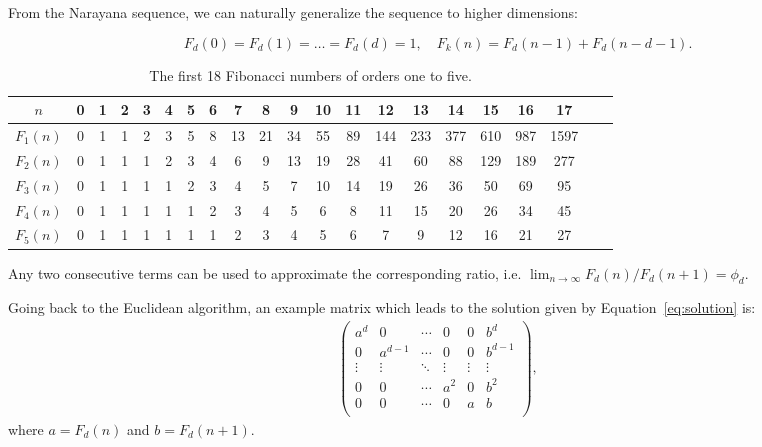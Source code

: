 \documentclass[english,version-2020-11]{uzl-thesis}
\begin{document}
From the Narayana sequence, we can naturally generalize the sequence to higher dimensions:

\[
  F_d(0) = F_d(1) = \dots = F_d(d) = 1, \quad F_k(n) = F_d(n - 1) + F_d(n - d - 1).
\]

\begin{table}[t]
  \caption{The first 18 Fibonacci numbers of orders one to five.}
  \begin{tabular}{c|cccccccccccccccccccc}
    $n$     & 0 & 1 & 2 & 3 & 4 & 5 & 6 & 7  & 8  & 9  & 10 & 11 & 12  & 13  & 14  & 15  & 16  & 17   \\ %
    \hline
    $F_1(n)$ & 0 & 1 & 1 & 2 & 3 & 5 & 8 & 13 & 21 & 34 & 55 & 89 & 144 & 233 & 377 & 610 & 987 & 1597 \\ %
    $F_2(n)$ & 0 & 1 & 1 & 1 & 2 & 3 & 4 & 6  & 9  & 13 & 19 & 28 & 41  & 60  & 88  & 129 & 189 & 277  \\ %
    $F_3(n)$ & 0 & 1 & 1 & 1 & 1 & 2 & 3 & 4  & 5  & 7  & 10 & 14 & 19  & 26  & 36  & 50  & 69  & 95   \\ %
    $F_4(n)$ & 0 & 1 & 1 & 1 & 1 & 1 & 2 & 3  & 4  & 5  & 6  & 8  & 11  & 15  & 20  & 26  & 34  & 45   \\ %
    $F_5(n)$ & 0 & 1 & 1 & 1 & 1 & 1 & 1 & 2  & 3  & 4  & 5  & 6  & 7   & 9   & 12  & 16  & 21  & 27   \\ %
  \end{tabular}
\end{table}

Any two consecutive terms can be used to approximate the corresponding ratio, i.e. $\lim_{n \to \infty} F_d(n) / F_d(n + 1) = \phi_d$.

Going back to the Euclidean algorithm,
an example matrix which leads to the solution given by Equation~\ref{eq:solution} is:
\begin{align*}
  \left(\begin{array}{ccccc|c}
    a^d    & 0       & \cdots & 0      & 0      & b^d     \\
    0      & a^{d-1} & \cdots & 0      & 0      & b^{d-1} \\
    \vdots & \vdots  & \ddots & \vdots & \vdots & \vdots  \\
    0      & 0       & \cdots & a^2    & 0      & b^2     \\
    0      & 0       & \cdots & 0      & a      & b       \\
  \end{array}\right),
\end{align*}
where $a = F_d(n)$ and $b = F_d(n + 1)$.
\end{document}
